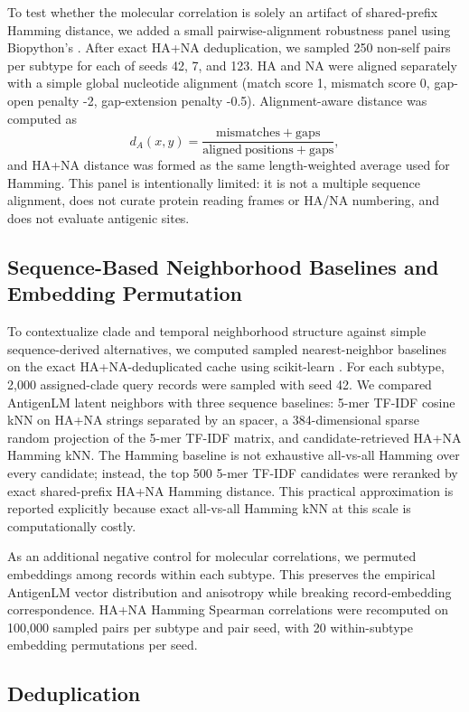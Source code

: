 \documentclass[11pt]{article}
\begin{document}
To test whether the molecular correlation is solely an artifact of shared-prefix Hamming distance, we added a small pairwise-alignment robustness panel using Biopython's  \cite{cock2009biopython}. After exact HA+NA deduplication, we sampled 250 non-self pairs per subtype for each of seeds 42, 7, and 123. HA and NA were aligned separately with a simple global nucleotide alignment (match score 1, mismatch score 0, gap-open penalty -2, gap-extension penalty -0.5). Alignment-aware distance was computed as
\[
d_A(x,y)=\frac{\mathrm{mismatches}+\mathrm{gaps}}{\mathrm{aligned\ positions}+\mathrm{gaps}},
\]
and HA+NA distance was formed as the same length-weighted average used for Hamming. This panel is intentionally limited: it is not a multiple sequence alignment, does not curate protein reading frames or HA/NA numbering, and does not evaluate antigenic sites.

\subsection{Sequence-Based Neighborhood Baselines and Embedding Permutation}

To contextualize clade and temporal neighborhood structure against simple sequence-derived alternatives, we computed sampled nearest-neighbor baselines on the exact HA+NA-deduplicated cache using scikit-learn \cite{pedregosa2011scikit}. For each subtype, 2,000 assigned-clade query records were sampled with seed 42. We compared AntigenLM latent neighbors with three sequence baselines: 5-mer TF-IDF cosine kNN on HA+NA strings separated by an  spacer, a 384-dimensional sparse random projection of the 5-mer TF-IDF matrix, and candidate-retrieved HA+NA Hamming kNN. The Hamming baseline is not exhaustive all-vs-all Hamming over every candidate; instead, the top 500 5-mer TF-IDF candidates were reranked by exact shared-prefix HA+NA Hamming distance. This practical approximation is reported explicitly because exact all-vs-all Hamming kNN at this scale is computationally costly.

As an additional negative control for molecular correlations, we permuted embeddings among records within each subtype. This preserves the empirical AntigenLM vector distribution and anisotropy while breaking record-embedding correspondence. HA+NA Hamming Spearman correlations were recomputed on 100,000 sampled pairs per subtype and pair seed, with 20 within-subtype embedding permutations per seed.

\subsection{Deduplication}
\end{document}
